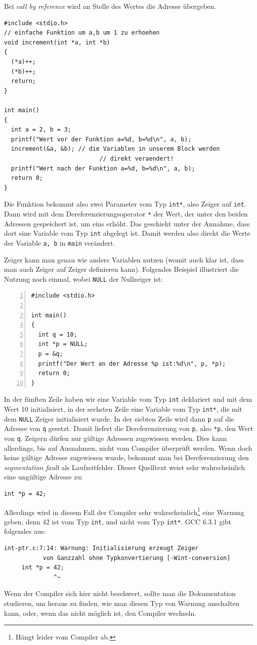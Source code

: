 Bei \emph{call by reference} wird an Stelle des Wertes die Adresse übergeben.
\begin{lstlisting}
#include <stdio.h>
// einfache Funktion um a,b um 1 zu erhoehen
void increment(int *a, int *b)
{
  (*a)++;
  (*b)++;
  return;
}

int main()
{
  int a = 2, b = 3;
  printf("Wert vor der Funktion a=%d, b=%d\n", a, b);
  increment(&a, &b); // die Variablen in unserem Block werden
                           // direkt veraendert!
  printf("Wert nach der Funktion a=%d, b=%d\n", a, b);
  return 0;
}
\end{lstlisting}
Die Funktion bekommt also zwei Parameter vom Typ \verb|int*|, also Zeiger auf \verb|int|.
Dann wird mit dem Dereferenzierungsoperator \verb|*| der Wert, der unter den beiden Adressen gespeichert ist, um eins erhöht.
Das geschieht unter der Annahme, dass dort eine Variable vom Typ \verb|int| abgelegt ist.
Damit werden also direkt die Werte der Variable \verb|a, b| in \verb|main| verändert.

Zeiger kann man genau wie andere Variablen nutzen (womit auch klar ist, dass man auch Zeiger auf Zeiger definieren kann).
Folgendes Beispiel illustriert die Nutzung noch einmal, wobei \verb|NULL| der Nullzeiger ist:
\begin{lstlisting}[numbers=left]
#include <stdio.h>

int main()
{
  int q = 10;
  int *p = NULL;
  p = &q;
  printf("Der Wert an der Adresse %p ist:%d\n", p, *p);
  return 0;
}
\end{lstlisting}
In der fünften Zeile haben wir eine Variable vom Typ \verb|int| deklariert und mit dem Wert 10 initialisiert, in der sechsten Zeile eine Variable vom Typ \verb|int*|, die mit dem \verb|NULL| Zeiger initialisiert wurde.
In der siebten Zeile wird dann \verb|p| auf die Adresse von \verb|q| gesetzt.
Damit liefert die Dereferenzierung von \verb|p|, also \verb|*p|, den Wert von \verb|q|.
Zeigern dürfen nur gültige Adressen zugewiesen werden.
Dies kann allerdings, bis auf Ausnahmen, nicht vom Compiler überprüft werden.
Wenn doch keine gültige Adresse zugewiesen wurde, bekommt man bei Dereferenzierung den \emph{segmentation fault} als Laufzeitfehler.
Dieser Quelltext weist sehr wahrscheinlich eine ungültige Adresse zu:
\begin{lstlisting}
int *p = 42;
\end{lstlisting}
Allerdings wird in diesem Fall der Compiler sehr wahrscheinlich\footnote{Hängt leider vom Compiler ab.} eine Warnung geben, denn 42 ist vom Typ \verb|int|, und nicht vom Typ \verb|int*|.
GCC 6.3.1 gibt folgendes aus:
\begin{verbatim}
int-ptr.c:7:14: Warnung: Initialisierung erzeugt Zeiger 
           von Ganzzahl ohne Typkonvertierung [-Wint-conversion]
     int *p = 42;
              ^~
\end{verbatim}
Wenn der Compiler sich hier nicht beschwert, sollte man die Dokumentation studieren, um heraus zu finden, wie man diesen Typ von Warnung anschalten kann, oder, wenn das nicht möglich ist, den Compiler wechseln.

